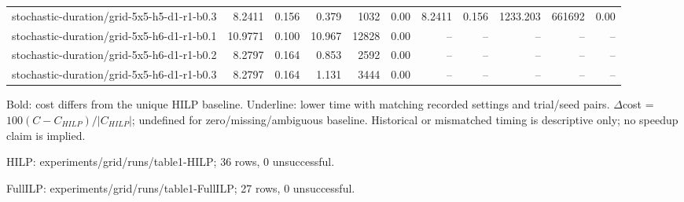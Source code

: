 \documentclass[10pt]{article}
\begin{document}
\begin{tabular}{p{65mm}rrrrrrrrrr}
stochastic-\allowbreak duration/\allowbreak grid-\allowbreak 5x5-\allowbreak h5-\allowbreak d1-\allowbreak r1-\allowbreak b0.3 & 8.2411 & 0.156 & 0.379 & 1032 & 0.00 & 8.2411 & 0.156 & 1233.203 & 661692 & 0.00 \\
stochastic-\allowbreak duration/\allowbreak grid-\allowbreak 5x5-\allowbreak h6-\allowbreak d1-\allowbreak r1-\allowbreak b0.1 & 10.9771 & 0.100 & 10.967 & 12828 & 0.00 & -- & -- & -- & -- & -- \\
stochastic-\allowbreak duration/\allowbreak grid-\allowbreak 5x5-\allowbreak h6-\allowbreak d1-\allowbreak r1-\allowbreak b0.2 & 8.2797 & 0.164 & 0.853 & 2592 & 0.00 & -- & -- & -- & -- & -- \\
stochastic-\allowbreak duration/\allowbreak grid-\allowbreak 5x5-\allowbreak h6-\allowbreak d1-\allowbreak r1-\allowbreak b0.3 & 8.2797 & 0.164 & 1.131 & 3444 & 0.00 & -- & -- & -- & -- & -- \\
\bottomrule\end{tabular}\par
\medskip\footnotesize
Bold: cost differs from the unique HILP baseline. Underline: lower time with matching recorded settings and trial/seed pairs. $\Delta$cost = $100(C-C_{HILP})/|C_{HILP}|$; undefined for zero/missing/ambiguous baseline. Historical or mismatched timing is descriptive only; no speedup claim is implied.\par
HILP: experiments/grid/runs/table1-HILP; 36 rows, 0 unsuccessful.\par
FullILP: experiments/grid/runs/table1-FullILP; 27 rows, 0 unsuccessful.\par
\end{document}
